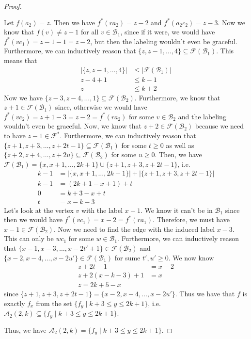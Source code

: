 \documentclass[10pt]{article}
\theoremstyle{definition}
\begin{document}
\begin{proof}
\begin{enumerate}
      Let $f(a_2) = z$. Then we have $f^*(r a_2) = z - 2$ and $f^*(a_2 c_2) = z - 3$. Now we know that $f(v) \neq z - 1$ for all $v \in \mathcal{B}_1$, since if it were, we would have $f^*(v c_1) = z - 1 - 1 = z - 2$, but then the labeling wouldn't even be graceful. Furthermore, we can inductively reason that $\{z, z-1, \dots, 4\} \subseteq \mathcal{F}(\mathcal{B}_1)$. This means that
      \begin{align*}
        |\{z, z-1, \dots, 4\}| &\le |\mathcal{F}(\mathcal{B}_1)| \\
        z - 4 + 1 &\le k - 1 \\
        z &\le k + 2
      \end{align*}
      Now we have $\{z - 3 , z - 4, \dots, 1\} \subseteq \mathcal{F}(\mathcal{B}_2)$. Furthermore, we know that $z + 1 \in \mathcal{F}(\mathcal{B}_1)$ since, otherwise we would have $f^*(v c_2) = z + 1 - 3 = z - 2 = f^*(r a_2)$ for some $v \in \mathcal{B}_2$ and the labeling wouldn't even be graceful. Now, we know that $z + 2 \in \mathcal{F}(\mathcal{B}_2)$ because we need to have $z - 1 \in \mathcal{F}^*$. Furthermore, we can inductively reason that $\{z + 1, z + 3, \dots, z + 2t - 1\} \subseteq \mathcal{F}(\mathcal{B}_1)$ for some $t \ge 0$ as well as $\{z + 2, z + 4, \dots, z + 2u\} \subseteq \mathcal{F}(\mathcal{B}_2)$ for some $u \ge 0$. Then, we have $\mathcal{F}(\mathcal{B}_1) = \{x, x + 1, \dots, 2k + 1\} \cup \{z + 1, z + 3, z + 2t - 1\}$, i.e.
      \begin{align*}
        k - 1 &= |\{x, x + 1, \dots, 2k + 1\}| + |\{z + 1, z + 3, z + 2t - 1\}| \\
        k - 1 &= (2k + 1 - x + 1) + t \\
        0 &= k + 3 - x + t\\
        t &= x - k - 3
      \end{align*}
      Let's look at the vertex $v$ with the label $x - 1$. We know it can't be in $\mathcal{B}_1$ since then we would have $f^*(v c_1) = x - 2 = f^*(r a_1)$. Therefore, we must have $x - 1 \in \mathcal{F}(\mathcal{B}_2)$. Now we need to find the edge with the induced label $x - 3$. This can only be $w c_1$ for some $w \in \mathcal{B}_1$. Furthermore, we can inductively reason that $\{x - 1, x - 3, \dots, x - 2t' + 1\} \in \mathcal{F}(\mathcal{B}_2)$ and $\{x - 2, x -  4, \dots, x - 2u'\} \in \mathcal{F}(\mathcal{B}_1)$  for sume $t', u' \ge 0$. We now know
      \begin{align*}
        z + 2t - 1 &= x - 2\\
        z + 2(x - k - 3) + 1 &= x \\
        z = 2k + 5 - x
      \end{align*}
      since $\{z + 1, z + 3, z + 2t - 1\} = \{x - 2, x -  4, \dots, x - 2u'\}$. Thus we have that $f$ is exactly $f_x$ from the set $\{f_y \mid k + 3 \le y \le 2k + 1\}$, i.e. $\mathcal{A}_2(2, k) \subseteq \{f_y \mid k + 3 \le y \le 2k + 1\}$.
  \end{enumerate}
  Thus, we have $\mathcal{A}_2(2, k) = \{f_y \mid k + 3 \le y \le 2k + 1\}$.
\end{proof}
\end{document}
